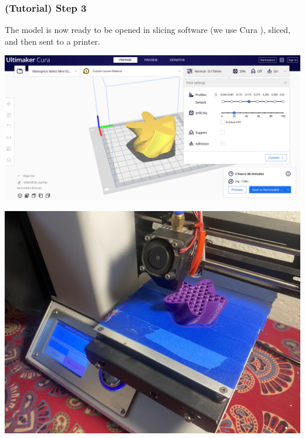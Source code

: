 \documentclass[12 pt]{article}
\begin{document}
\subsubsection*{(Tutorial) Step 3}
The model is now ready to be opened in slicing software (we use Cura \cite{Cura}), sliced, and then sent to a printer.
\begin{center}
    \includegraphics[width = .65\paperwidth]{images/cura.png}
\end{center}
\begin{center}
    \includegraphics[width=.65\paperwidth]{images/printing.jpg}
\end{center}
\end{document}
